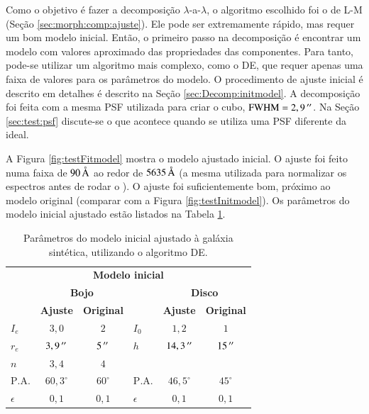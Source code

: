 
Como o objetivo é fazer a decomposição $\lambda$-a-$\lambda$, o algoritmo
escolhido foi o de L-M (Seção \ref{sec:morph:comp:ajuste}). Ele pode ser
extremamente rápido, mas requer um bom modelo inicial. Então, o primeiro passo
na decomposição é encontrar um modelo com valores aproximado das propriedades
das componentes. Para tanto, pode-se utilizar um algoritmo mais complexo, como o
DE, que requer apenas uma faixa de valores para os parâmetros do modelo.
O procedimento de ajuste inicial é descrito em detalhes é descrito na Seção
\ref{sec:Decomp:initmodel}. A decomposição foi feita com a mesma PSF utilizada
para criar o cubo, $\mathrm{FWHM} = 2,9\,^{\prime\prime}$. Na Seção \ref{sec:test:psf}
discute-se o que acontece quando se utiliza uma PSF diferente da ideal.

A Figura \ref{fig:testFitmodel} mostra o modelo ajustado inicial. O ajuste
foi feito numa faixa de $90\,\text{\normalfont\AA}$ ao redor de $5635\,\text{\normalfont\AA}$ (a
mesma utilizada para normalizar os espectros antes de rodar o \starlight).
O ajuste foi suficientemente bom, próximo ao modelo original (comparar com a
Figura \ref{fig:testInitmodel}). Os parâmetros do modelo inicial ajustado estão
listados na Tabela \ref{tab:testeModeloInicial}.

\begin{table}
\begin{tabular}{ l c c l c c }
  \hline
  \multicolumn{6}{c}{\textbf{Modelo inicial}} \\
  & \multicolumn{2}{c}{\textbf{Bojo}} & & \multicolumn{2}{c}{\textbf{Disco}} \\
  & \textbf{Ajuste} & \textbf{Original} & & \textbf{Ajuste} & \textbf{Original} \\
  \hline
  $I_e$ & $3,0$ & $2$ & $I_0$ & $1,2$ & $1$ \\
  $r_e$ & $3,9\,^{\prime\prime}$ & $5\,^{\prime\prime}$ & $h$ & $14,3\,^{\prime\prime}$ & $15\,^{\prime\prime}$\\
  $n$ & $3,4$ & $4$ & & & \\
  $\mathrm{P.A.}$ & $60,3^\circ$ & $60^\circ$ & $\mathrm{P.A.}$ & $46,5^\circ$ &
  $45^\circ$ \\
  $\epsilon$ & $0,1$ & $0,1$ & $\epsilon$ & $0,1$ & $0,1$ \\
  \hline
\end{tabular}
\caption[Modelo inicial ajustado à galáxia sintética]
{Parâmetros do modelo inicial ajustado à galáxia sintética, utilizando o
algoritmo DE.}
\label{tab:testeModeloInicial}
\end{table}


